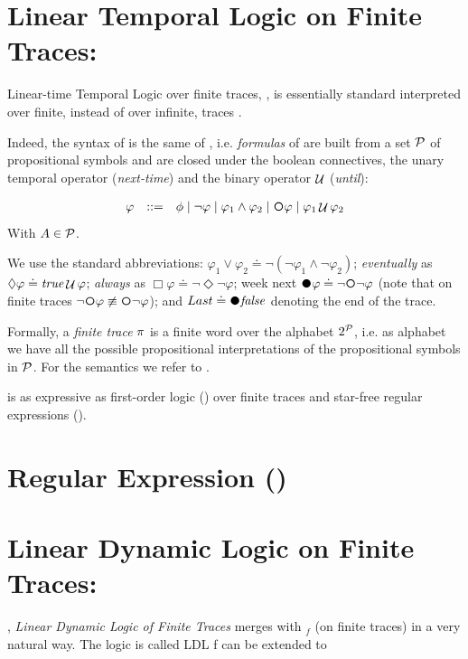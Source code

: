 \section{Linear Temporal Logic on Finite Traces: \LTLf}
Linear-time Temporal Logic over finite traces, \LTLf, is essentially standard 
\LTL \citep{Pnueli:1977:TLP:1382431.1382534} interpreted over finite, instead of over infinite, traces \citep{de2013linear}.

Indeed, the syntax of \LTLf is the same of \LTLf, i.e. \emph{formulas} of \LTLf are built from a set $\mathcal{P}$ of propositional symbols and are closed under the boolean connectives, the unary temporal operator \Next (\emph{next-time}) and the binary operator $\mathop{\mathcal{U}}$ (\emph{until}):

\[\begin{array}{rcl}
\varphi &::=& \phi \mid \lnot \varphi \mid \varphi_1\land \varphi_2 \mid \Next\varphi \mid \varphi_1 \Until \varphi_2
\end{array}
\]
With $A\in \mathcal{P}$.

We use the standard abbreviations:
$\varphi_1\lor\varphi_2 \doteq \lnot(\lnot \varphi_1\land \lnot
\varphi_2)$;
\emph{eventually} as $\Diamond\varphi \doteq \mathit{true}\mathop{\mathcal{U}}\varphi$;
\emph{always} as $\Box\varphi \doteq\lnot\Diamond\lnot\varphi$; 
week next $\Wnext\varphi \doteq \lnot\Next\lnot\varphi$ (note that on finite
traces $\lnot\Next\varphi \not\equiv \Next\lnot\varphi$); and $Last \doteq \Wnext\false$ denoting the end of the trace. 

Formally, a \emph{finite trace} $\pi$ is a finite word over the alphabet $2^{\mathcal{P}}$, i.e. as alphabet we have all the possible propositional interpretations of the propositional symbols in $\mathcal{P}$. For the semantics we refer to \citep{de2013linear}.

\LTLf is as expressive as 
first-order logic (\FO)
over finite traces
and star-free regular expressions (\REGEX).
\section{Regular Expression (\REGEX)}
\section{Linear Dynamic Logic on Finite Traces: \LDLf}
\LDLf, \emph{Linear Dynamic Logic of Finite Traces} merges \LTLf with \REGEX$_f$ (\REGEX on finite traces) in a very natural way.
The logic is called LDL f
\LTLf can be extended to 


